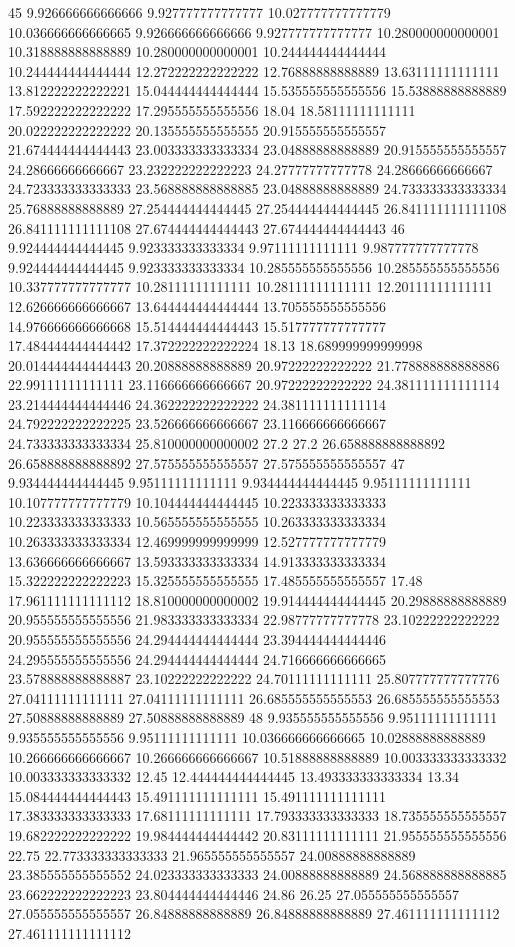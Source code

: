 45 9.926666666666666 9.927777777777777 10.027777777777779 10.036666666666665 9.926666666666666 9.927777777777777 10.280000000000001 10.318888888888889 10.280000000000001 10.244444444444444 10.244444444444444 12.272222222222222 12.76888888888889 13.63111111111111 13.812222222222221 15.044444444444444 15.535555555555556 15.53888888888889 17.592222222222222 17.295555555555556 18.04 18.58111111111111 20.022222222222222 20.135555555555555 20.915555555555557 21.674444444444443 23.003333333333334 23.04888888888889 20.915555555555557 24.28666666666667 23.232222222222223 24.27777777777778 24.28666666666667 24.723333333333333 23.568888888888885 23.04888888888889 24.733333333333334 25.76888888888889 27.254444444444445 27.254444444444445 26.841111111111108 26.841111111111108 27.674444444444443 27.674444444444443
46 9.924444444444445 9.923333333333334 9.97111111111111 9.987777777777778 9.924444444444445 9.923333333333334 10.285555555555556 10.285555555555556 10.337777777777777 10.28111111111111 10.28111111111111 12.20111111111111 12.626666666666667 13.644444444444444 13.705555555555556 14.976666666666668 15.514444444444443 15.517777777777777 17.484444444444442 17.372222222222224 18.13 18.689999999999998 20.014444444444443 20.20888888888889 20.97222222222222 21.778888888888886 22.99111111111111 23.116666666666667 20.97222222222222 24.381111111111114 23.214444444444446 24.362222222222222 24.381111111111114 24.792222222222225 23.526666666666667 23.116666666666667 24.733333333333334 25.810000000000002 27.2 27.2 26.658888888888892 26.658888888888892 27.575555555555557 27.575555555555557
47 9.934444444444445 9.95111111111111 9.934444444444445 9.95111111111111 10.107777777777779 10.104444444444445 10.223333333333333 10.223333333333333 10.565555555555555 10.263333333333334 10.263333333333334 12.469999999999999 12.527777777777779 13.636666666666667 13.593333333333334 14.913333333333334 15.322222222222223 15.325555555555555 17.485555555555557 17.48 17.961111111111112 18.810000000000002 19.914444444444445 20.29888888888889 20.955555555555556 21.983333333333334 22.98777777777778 23.10222222222222 20.955555555555556 24.294444444444444 23.394444444444446 24.295555555555556 24.294444444444444 24.716666666666665 23.578888888888887 23.10222222222222 24.70111111111111 25.807777777777776 27.04111111111111 27.04111111111111 26.685555555555553 26.685555555555553 27.50888888888889 27.50888888888889
48 9.935555555555556 9.95111111111111 9.935555555555556 9.95111111111111 10.036666666666665 10.02888888888889 10.266666666666667 10.266666666666667 10.51888888888889 10.003333333333332 10.003333333333332 12.45 12.444444444444445 13.493333333333334 13.34 15.084444444444443 15.491111111111111 15.491111111111111 17.383333333333333 17.68111111111111 17.793333333333333 18.735555555555557 19.682222222222222 19.984444444444442 20.83111111111111 21.955555555555556 22.75 22.773333333333333 21.965555555555557 24.00888888888889 23.385555555555552 24.023333333333333 24.00888888888889 24.568888888888885 23.662222222222223 23.804444444444446 24.86 26.25 27.055555555555557 27.055555555555557 26.84888888888889 26.84888888888889 27.461111111111112 27.461111111111112
